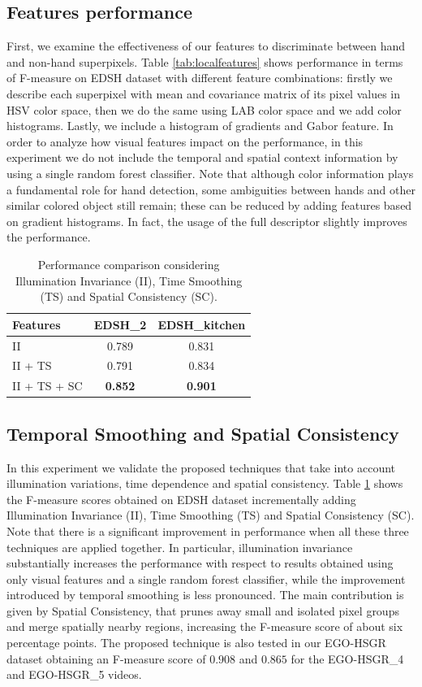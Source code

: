 \subsection{Features performance}

First, we examine the effectiveness of our features to discriminate between hand and non-hand superpixels. 
Table \ref{tab:localfeatures} shows performance in terms of F-measure on EDSH dataset with different feature combinations: firstly we describe each superpixel with mean and covariance matrix of its pixel values in HSV color space, then we do the same using LAB color space and we add color histograms. Lastly, we include a histogram of gradients and Gabor feature.
In order to analyze how visual features impact on the performance, in this experiment we do not include the temporal and spatial context information by using a single random forest classifier.     
Note that although color information plays a fundamental role for hand detection, some ambiguities between hands and other similar colored object still remain; these can be reduced by adding features based on gradient histograms. In fact, the usage of the full descriptor slightly improves the performance.      

\begin{table}
 \centering
 \begin{tabular}{|l|c|c|}
 \hline
 \textbf{Features} 	& \textbf{EDSH\_2} & \textbf{EDSH\_{kitchen}}	\\ \hline\hline
 II	& 0.789 & 	0.831		\\ \hline
 II + TS	& 0.791	&	0.834 \\ \hline
 II + TS + SC &	\textbf{0.852} &	\textbf{0.901}	\\ \hline  
 \end{tabular}
 \caption{Performance comparison considering Illumination Invariance (II), Time Smoothing (TS) and Spatial Consistency (SC).}\label{tab:context}
\end{table}


\subsection{Temporal Smoothing and Spatial Consistency}
In this experiment we validate the proposed techniques that take into account illumination variations, time dependence and spatial consistency.
Table \ref{tab:context} shows the F-measure scores obtained on EDSH dataset incrementally adding Illumination Invariance (II), Time Smoothing (TS) and Spatial Consistency (SC). 
Note that there is a significant improvement in performance when all these three techniques are applied together.   
In particular, illumination invariance substantially increases the performance with respect to results obtained using only visual features and a single random forest classifier, while the improvement introduced by temporal smoothing is less pronounced. The main contribution is given by Spatial Consistency, that prunes away small and isolated pixel groups and merge spatially nearby regions, increasing the F-measure score of about six percentage points.
The proposed technique is also tested in our EGO-HSGR dataset obtaining an F-measure score of $0.908$ and $0.865$ for the EGO-HSGR\_{4} and EGO-HSGR\_{5} videos.        


